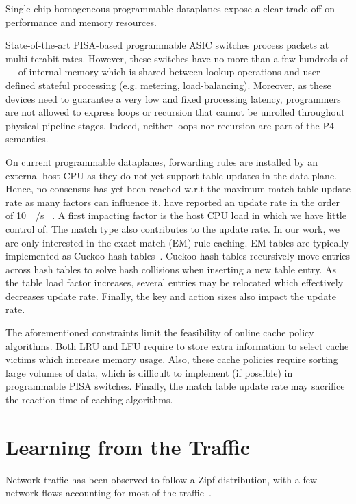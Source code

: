 Single-chip homogeneous programmable dataplanes expose a clear trade-off on performance and memory resources.

State-of-the-art PISA-based programmable ASIC switches process packets at multi-terabit rates.
However, these switches have no more than a few hundreds of \SI{}{\mega\byte} of internal memory which is shared between lookup operations and user-defined stateful processing (e.g. metering, load-balancing).
Moreover, as these devices need to guarantee a very low and fixed processing latency, programmers are not allowed to express loops or recursion that cannot be unrolled throughout physical pipeline stages.
Indeed, neither loops nor recursion are part of the P4 semantics.

On current programmable dataplanes, forwarding rules are installed by an external host CPU as they do not yet support table updates in the data plane.
Hence, no consensus has yet been reached w.r.t the maximum match table update rate as many factors can influence it.
\citeauthor{Jin:2017} have reported an update rate in the order of \SI{10}{\kilo\update/\second}
~\cite{Jin:2017}.
A first impacting factor is the host CPU load in which we have little control of.
The match type also contributes to the update rate.
In our work, we are only interested in the exact match (EM) rule caching. 
EM tables are typically implemented as Cuckoo hash tables~\cite{Kirsch:2009,Bosshart:2014}.
Cuckoo hash tables recursively move entries across hash tables to solve hash collisions when inserting a new table entry.
As the table load factor increases, several entries may be relocated which effectively decreases update rate.
Finally, the key and action sizes also impact the update rate.

The aforementioned constraints limit the feasibility of online cache policy algorithms.
Both LRU and LFU require to store extra information to select cache victims which increase memory usage.
Also, these cache policies require sorting large volumes of data, which is difficult to implement (if possible) in programmable PISA switches.
Finally, the match table update rate may sacrifice the reaction time of caching algorithms.

\section{Learning from the Traffic}\label{sec:traffic}

Network traffic has been observed to follow a Zipf distribution, with a few network flows accounting for most of the traffic~\cite{Sarrar:2012, Jin:2017}.

